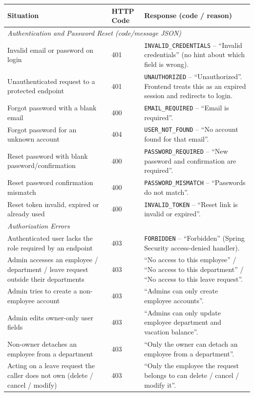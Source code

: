 \documentclass[11pt,a4paper]{article}
\begin{document}
\begin{longtable}{p{6cm} p{1.5cm} p{6cm}}
\toprule
\textbf{Situation} & \textbf{HTTP Code} & \textbf{Response (code / reason)} \\
\midrule
\endhead
\multicolumn{3}{l}{\textit{Authentication and Password Reset (code/message JSON)}} \\
\midrule
Invalid email or password on login & 401 & \texttt{INVALID\_CREDENTIALS} -- ``Invalid credentials'' (no hint about which field is wrong). \\
Unauthenticated request to a protected endpoint & 401 & \texttt{UNAUTHORIZED} -- ``Unauthorized''. Frontend treats this as an expired session and redirects to login. \\
Forgot password with a blank email & 400 & \texttt{EMAIL\_REQUIRED} -- ``Email is required''. \\
Forgot password for an unknown account & 404 & \texttt{USER\_NOT\_FOUND} -- ``No account found for that email''. \\
Reset password with blank password/confirmation & 400 & \texttt{PASSWORD\_REQUIRED} -- ``New password and confirmation are required''. \\
Reset password confirmation mismatch & 400 & \texttt{PASSWORD\_MISMATCH} -- ``Passwords do not match''. \\
Reset token invalid, expired or already used & 400 & \texttt{INVALID\_TOKEN} -- ``Reset link is invalid or expired''. \\
\midrule
\multicolumn{3}{l}{\textit{Authorization Errors}} \\
\midrule
Authenticated user lacks the role required by an endpoint & 403 & \texttt{FORBIDDEN} -- ``Forbidden'' (Spring Security access-denied handler). \\
Admin accesses an employee / department / leave request outside their departments & 403 & ``No access to this employee'' / ``No access to this department'' / ``No access to this leave request''. \\
Admin tries to create a non-employee account & 403 & ``Admins can only create employee accounts''. \\
Admin edits owner-only user fields & 403 & ``Admins can only update employee department and vacation balance''. \\
Non-owner detaches an employee from a department & 403 & ``Only the owner can detach an employee from a department''. \\
Acting on a leave request the caller does not own (delete / cancel / modify) & 403 & ``Only the employee the request belongs to can delete / cancel / modify it''. \\

\end{longtable}
\end{document}
